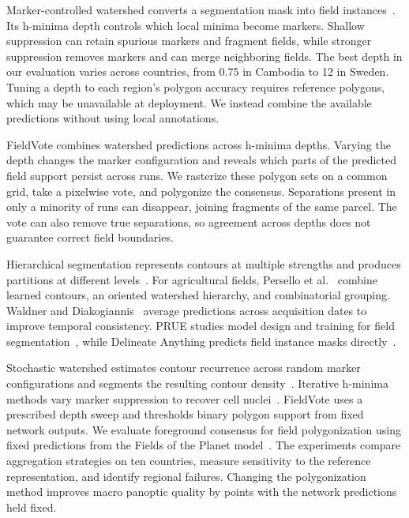 \documentclass[journal]{IEEEtran}
\newcommand{\method}{FieldVote}
\begin{document}
Marker-controlled watershed converts a segmentation mask into field instances~\cite{soille2004morphological,waldner2020decode}.
Its h-minima depth controls which local minima become markers.
Shallow suppression can retain spurious markers and fragment fields, while stronger suppression removes markers and can merge neighboring fields.
The best depth in our evaluation varies across countries, from 0.75 in Cambodia to 12 in Sweden.
Tuning a depth to each region's polygon accuracy requires reference polygons, which may be unavailable at deployment.
We instead combine the available predictions without using local annotations.

\method{} combines watershed predictions across h-minima depths.
Varying the depth changes the marker configuration and reveals which parts of the predicted field support persist across runs.
We rasterize these polygon sets on a common grid, take a pixelwise vote, and polygonize the consensus.
Separations present in only a minority of runs can disappear, joining fragments of the same parcel.
The vote can also remove true separations, so agreement across depths does not guarantee correct field boundaries.

Hierarchical segmentation represents contours at multiple strengths and produces partitions at different levels~\cite{arbelaez2011hierarchical,maninis2018cob}.
For agricultural fields, Persello et al.~\cite{persello2019delineation} combine learned contours, an oriented watershed hierarchy, and combinatorial grouping.
Waldner and Diakogiannis~\cite{waldner2020edge} average predictions across acquisition dates to improve temporal consistency.
PRUE studies model design and training for field segmentation~\cite{muhawenayo2026prue}, while Delineate Anything predicts field instance masks directly~\cite{lavreniuk2025delineateanything}.

Stochastic watershed estimates contour recurrence across random marker configurations and segments the resulting contour density~\cite{angulo2007stochastic}.
Iterative h-minima methods vary marker suppression to recover cell nuclei~\cite{koyuncu2016iterative}.
\method{} uses a prescribed depth sweep and thresholds binary polygon support from fixed network outputs.
We evaluate foreground consensus for field polygonization using fixed predictions from the Fields of the Planet model~\cite{corley_ftp}.
The experiments compare aggregation strategies on ten countries, measure sensitivity to the reference representation, and identify regional failures.
Changing the polygonization method improves macro panoptic quality by \GainPQ{} points with the network predictions held fixed.
\end{document}
